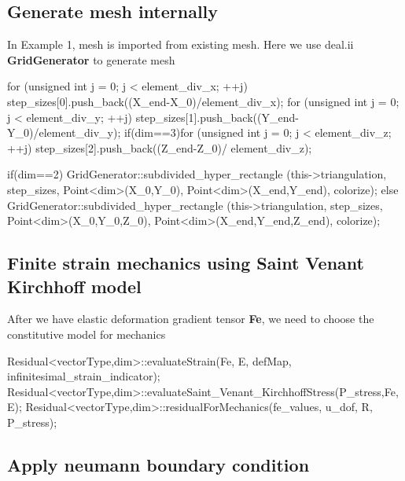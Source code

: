 \hypertarget{battery_electrode_scale_Generate}{}\subsection{Generate mesh internally}\label{battery_electrode_scale_Generate}
In Example 1, mesh is imported from existing mesh. Here we use deal.\+ii {\bfseries Grid\+Generator} to generate mesh 
\begin{DoxyCode}
\textcolor{keywordflow}{for} (\textcolor{keywordtype}{unsigned} \textcolor{keywordtype}{int} j = 0; j < element\_div\_x; ++j) step\_sizes[0].push\_back((X\_end-X\_0)/element\_div\_x); 
\textcolor{keywordflow}{for} (\textcolor{keywordtype}{unsigned} \textcolor{keywordtype}{int} j = 0; j < element\_div\_y; ++j) step\_sizes[1].push\_back((Y\_end-Y\_0)/element\_div\_y);
\textcolor{keywordflow}{if}(dim==3)\textcolor{keywordflow}{for} (\textcolor{keywordtype}{unsigned} \textcolor{keywordtype}{int} j = 0; j < element\_div\_z; ++j) step\_sizes[2].push\_back((Z\_end-Z\_0)/
      element\_div\_z);

\textcolor{keywordflow}{if}(dim==2) GridGenerator::subdivided\_hyper\_rectangle (this->triangulation, step\_sizes, Point<dim>(X\_0,Y\_0),
       Point<dim>(X\_end,Y\_end), colorize);
\textcolor{keywordflow}{else} GridGenerator::subdivided\_hyper\_rectangle (this->triangulation, step\_sizes, Point<dim>(X\_0,Y\_0,Z\_0), 
      Point<dim>(X\_end,Y\_end,Z\_end), colorize);
\end{DoxyCode}
\hypertarget{battery_electrode_scale_Finite}{}\subsection{Finite strain mechanics using Saint Venant Kirchhoff model}\label{battery_electrode_scale_Finite}
After we have elastic deformation gradient tensor {\bfseries Fe}, we need to choose the constitutive model for mechanics 
\begin{DoxyCode}
Residual<vectorType,dim>::evaluateStrain(Fe, E, defMap, infinitesimal\_strain\_indicator);
Residual<vectorType,dim>::evaluateSaint_Venant_KirchhoffStress(P\_stress,Fe, E);
Residual<vectorType,dim>::residualForMechanics(fe\_values, u\_dof, R, P\_stress);  
\end{DoxyCode}
\hypertarget{battery_electrode_scale_neumann}{}\subsection{Apply neumann boundary condition}\label{battery_electrode_scale_neumann}
